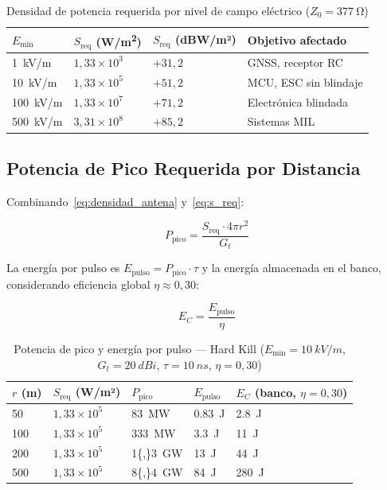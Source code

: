\documentclass[12pt,a4paper]{article}
\begin{document}
\begin{table}[H]
\centering
\caption{Densidad de potencia requerida por nivel de campo eléctrico ($Z_0 = \SI{377}{\ohm}$)}
\label{tab:s_campo}
\renewcommand{\arraystretch}{1.3}
\begin{tabularx}{\textwidth}{XXXX}
\toprule
$E_\mathrm{min}$ &
$S_\mathrm{req}$ (\si{W/m^2}) &
$S_\mathrm{req}$ (dBW/m²) &
Objetivo afectado \\
\midrule
\SI{1}{kV/m}   & $1{,}33 \times 10^3$ & $+31{,}2$ & GNSS, receptor RC \\
\SI{10}{kV/m}  & $1{,}33 \times 10^5$ & $+51{,}2$ & MCU, ESC sin blindaje \\
\SI{100}{kV/m} & $1{,}33 \times 10^7$ & $+71{,}2$ & Electrónica blindada \\
\SI{500}{kV/m} & $3{,}31 \times 10^8$ & $+85{,}2$ & Sistemas MIL \\
\bottomrule
\end{tabularx}
\end{table}

\subsection{Potencia de Pico Requerida por Distancia}

Combinando~\eqref{eq:densidad_antena} y~\eqref{eq:s_req}:

\begin{equation}
  P_\mathrm{pico} = \frac{S_\mathrm{req} \cdot 4\pi r^2}{G_t}
  \label{eq:ppico}
\end{equation}

La energía por pulso es $E_\mathrm{pulso} = P_\mathrm{pico} \cdot \tau$
y la energía almacenada en el banco, considerando eficiencia global
$\eta \approx 0{,}30$:

\begin{equation}
  E_C = \frac{E_\mathrm{pulso}}{\eta}
  \label{eq:ec}
\end{equation}

\begin{table}[H]
\centering
\caption{Potencia de pico y energía por pulso — Hard Kill ($E_\mathrm{min} = \SI{10}{kV/m}$,
         $G_t = \SI{20}{dBi}$, $\tau = \SI{10}{ns}$, $\eta = 0{,}30$)}
\label{tab:ppico}
\renewcommand{\arraystretch}{1.3}
\begin{tabularx}{\textwidth}{XXXXX}
\toprule
$r$ (m) &
$S_\mathrm{req}$ (W/m²) &
$P_\mathrm{pico}$ &
$E_\mathrm{pulso}$ &
$E_C$ (banco, $\eta = 0{,}30$) \\
\midrule
50   & $1{,}33 \times 10^5$ & \SI{83}{MW}    & \SI{0,83}{J} & \SI{2,8}{J}  \\
100  & $1{,}33 \times 10^5$ & \SI{333}{MW}   & \SI{3,3}{J}  & \SI{11}{J}     \\
200  & $1{,}33 \times 10^5$ & \SI{1{,}3}{GW} & \SI{13}{J}     & \SI{44}{J}     \\
500  & $1{,}33 \times 10^5$ & \SI{8{,}4}{GW} & \SI{84}{J}     & \SI{280}{J}    \\
\bottomrule
\end{tabularx}
\end{table}
\end{document}
